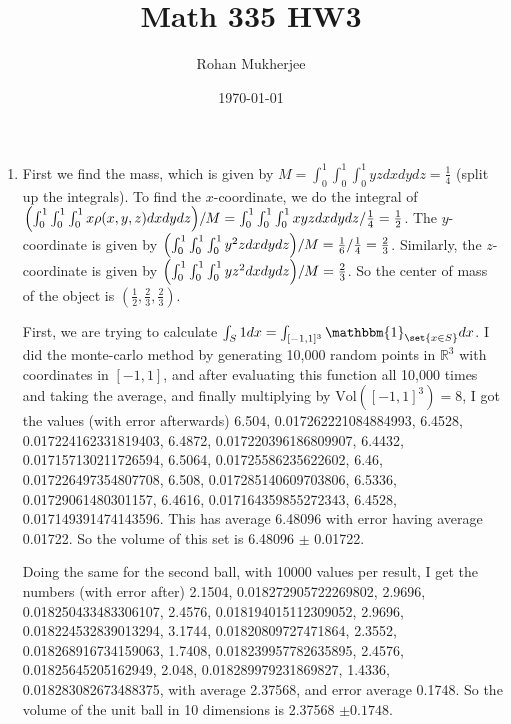 \documentclass[12pt]{article}
\title{Math 335 HW3}
\date{\today}
\author{Rohan Mukherjee}
\theoremstyle{definition}
\theoremstyle{remark}
\newcommand{\R}{\mathbb{R}}
\begin{document}
	\maketitle
	\begin{enumerate}[leftmargin=\labelsep]
		
		\item First we find the mass, which is given by $M = \int_0^1 \int_0^1 \int_0^1 yz dx dy dz = \frac14$ (split up the integrals). To find the $x$-coordinate, we do the integral of $\qty(\int_0^1 \int_0^1 \int_0^1 x \rho(x, y, z) dx dy dz)/M = \int_0^1 \int_0^1 \int_0^1 xyzdxdydz / \frac 14 = \frac 12$. The $y$-coordinate is given by $\qty(\int_0^1 \int_0^1 \int_0^1 y^2zdxdydz)/M = \frac16/ \frac14 = \frac 23$. Similarly, the $z$-coordinate is given by $\qty(\int_0^1 \int_0^1 \int_0^1 yz^2dxdydz)/M = \frac 23$. So the center of mass of the object is $(\frac 12, \frac 23, \frac 23)$.
		
		First, we are trying to calculate $\int_S 1dx = \int_{[-1,1]^3} \mathbbm{1}_{\set{x \in S}} dx$. I did the monte-carlo method by generating 10,000 random points in $\R^3$ with coordinates in $[-1, 1]$, and after evaluating this function all 10,000 times and taking the average, and finally multiplying by $\mathrm{Vol}([-1, 1]^3) = 8$, I got the values (with error afterwards) 6.504, 0.017262221084884993, 6.4528, 0.017224162331819403, 6.4872, 0.017220396186809907, 6.4432, 0.017157130211726594, 6.5064, 0.01725586235622602, 6.46, 0.017226497354807708, 6.508, 0.017285140609703806, 6.5336, 0.01729061480301157, 6.4616, 0.017164359855272343, 6.4528, 0.017149391474143596. This has average 6.48096 with error having average 0.01722. So the volume of this set is 6.48096 $\pm$ 0.01722.
		
		
		Doing the same for the second ball, with 10000 values per result, I get the numbers (with error after) 2.1504, 0.018272905722269802, 2.9696, 0.018250433483306107, 2.4576, 0.018194015112309052, 2.9696, 0.018224532839013294, 3.1744, 0.01820809727471864, 2.3552, 0.018268916734159063, 1.7408, 0.018239957782635895, 2.4576, 0.01825645205162949, 2.048, 0.018289979231869827, 1.4336, 0.018283082673488375, with average 2.37568, and error average 0.1748. So the volume of the unit ball in 10 dimensions is 2.37568 $\pm 0.1748$.
		

\end{enumerate}
\end{document}
